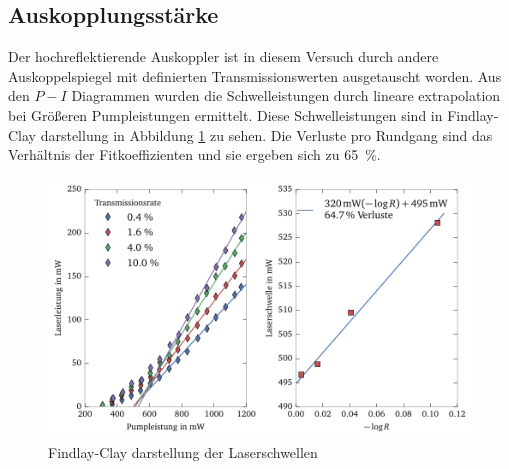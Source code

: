 \documentclass[11pt,twoside=true]{scrartcl}
\begin{document}
\subsection{Auskopplungsstärke}
Der hochreflektierende Auskoppler ist in diesem Versuch durch andere Auskoppelspiegel
mit definierten Transmissionswerten ausgetauscht worden. Aus den $P-I$  Diagrammen
wurden die Schwelleistungen durch lineare extrapolation bei Größeren Pumpleistungen
ermittelt. Diese Schwelleistungen sind in Findlay-Clay darstellung in Abbildung
\ref{fig:findlay_clay} zu sehen. Die Verluste pro Rundgang sind das Verhältnis
der Fitkoeffizienten und sie ergeben sich zu \SI{65}{\percent}. 
\begin{figure}[h!]
  \centering
  \includegraphics[width=1\textwidth]{./figures/findlay_clay.pdf}
  \caption{Findlay-Clay darstellung der Laserschwellen}
  \label{fig:findlay_clay}
\end{figure}
\end{document}

